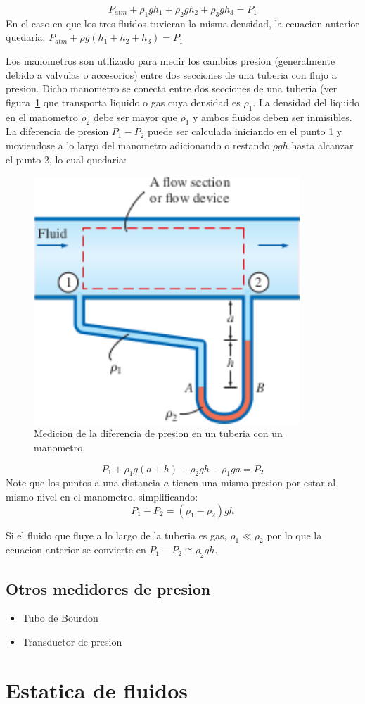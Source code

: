 \documentclass[10pt, oneside]{article}
\begin{document}
$$
P_{atm} + \rho_1 g h_1 + \rho_2 g h_2 + \rho_3 g h_3 = P_1
$$
En el caso en que los tres fluidos tuvieran la misma densidad, la ecuacion anterior quedaria: $P_{atm}+\rho g(h_1 + h_2 + h_3) = P_1$

Los manometros son utilizado para medir los cambios presion (generalmente debido a valvulas o accesorios) entre dos secciones de una tuberia con flujo a presion.  Dicho manometro se conecta entre dos secciones de una tuberia (ver figura~\ref{mano4} que transporta liquido o gas cuya densidad es $\rho_1$. La densidad del liquido en el manometro $\rho_2$ debe ser mayor que $\rho_1$ y ambos fluidos deben ser inmisibles. La diferencia de presion $P_1 - P_2$ puede ser calculada iniciando en el punto 1 y moviendose a lo largo del manometro adicionando o restando $\rho g h$ hasta alcanzar el punto 2, lo cual quedaria:

\begin{figure}[h]
\centering
\includegraphics[width=10cm]{mano4}
\caption{Medicion de la diferencia de presion en un tuberia con un manometro.}
\label{mano4}
\end{figure}

$$
P_1 + \rho_1 g (a+h) - \rho_2 g h - \rho_1 ga = P_2
$$
Note que los puntos a una distancia $a$ tienen una misma presion por estar al mismo nivel en el manometro, simplificando:
$$
P_1 - P_2 = (\rho_1 - \rho_2)gh
$$

Si el fluido que fluye a lo largo de la tuberia es gas, $\rho_1 \ll \rho_2$ por lo que la ecuacion anterior se convierte en $P_1-P_2 \cong \rho_2 g h$.


\subsection{Otros medidores de presion}
\begin{itemize}
\item Tubo de Bourdon
\item Transductor de presion
\end{itemize}

\section{Estatica de fluidos}
\end{document}
